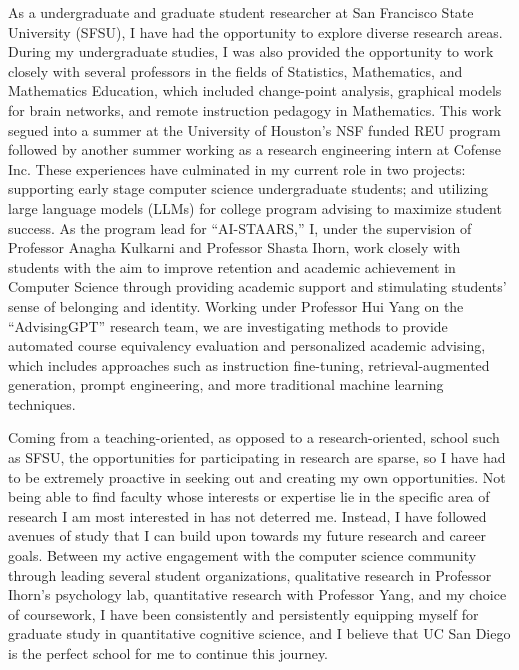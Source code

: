 \documentclass[10pt]{article}
\begin{document}
As a undergraduate and graduate student researcher at San Francisco State University (SFSU), I have had the opportunity to explore diverse
research areas. During my undergraduate studies, I was also provided the opportunity to work closely with several professors in the fields
of Statistics, Mathematics, and Mathematics Education, which included change-point analysis, graphical models for brain networks, and
remote instruction pedagogy in Mathematics. This work segued into a summer at the University of Houston's NSF funded REU program followed
by another summer working as a research engineering intern at Cofense Inc. These experiences have culminated in my current role in two
projects: supporting early stage computer science undergraduate students; and utilizing large language models (LLMs) for college program
advising to maximize student success. As the program lead for ``AI-STAARS,'' I, under the supervision of Professor Anagha Kulkarni and
Professor Shasta Ihorn, work closely with students with the aim to improve retention and academic achievement in Computer Science through
providing academic support and stimulating students' sense of belonging and identity. Working under Professor Hui Yang on the
``AdvisingGPT'' research team, we are investigating methods to provide automated course equivalency evaluation and personalized academic
advising, which includes approaches such as instruction fine-tuning, retrieval-augmented generation, prompt engineering, and more
traditional machine learning techniques.

Coming from a teaching-oriented, as opposed to a research-oriented, school such as SFSU, the opportunities for participating in research
are sparse, so I have had to be extremely proactive in seeking out and creating my own opportunities. Not being able to find faculty whose
interests or expertise lie in the specific area of research I am most interested in has not deterred me. Instead, I have followed avenues
of study that I can build upon towards my future research and career goals. Between my active engagement with the computer science
community through leading several student organizations, qualitative research in Professor Ihorn's psychology lab, quantitative research
with Professor Yang, and my choice of coursework, I have been consistently and persistently equipping myself for graduate study in
quantitative cognitive science, and I believe that UC San Diego is the perfect school for me to continue this journey.
\end{document}
